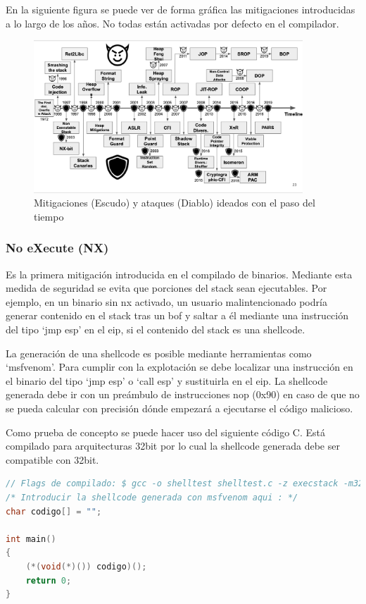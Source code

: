 En la siguiente figura se puede ver de forma gráfica las mitigaciones introducidas a lo largo de los años. No todas están activadas por defecto en el compilador.

\begin{figure}[htb!]
    \centering                        
    \includegraphics[width=0.9\textwidth]{images/mitigaciones.jpeg}
    \caption{Mitigaciones (Escudo) y ataques (Diablo) ideados con el paso del tiempo}
    \label{fig:mitigaciones}
\end{figure}
\FloatBarrier

\subsubsection{No eXecute (NX)}
Es la primera mitigación introducida en el compilado de binarios. Mediante esta medida de seguridad se evita que porciones del stack sean ejecutables.
Por ejemplo, en un binario sin \acrshort{nx} activado, un usuario malintencionado podría generar contenido en el stack tras un \acrshort{bof} y saltar a él mediante una instrucción del tipo `jmp esp' en el \acrshort{eip}, si el contenido del stack es una shellcode.

La generación de una shellcode es posible mediante herramientas como `msfvenom'.
Para cumplir con la explotación se debe localizar una instrucción en el binario del tipo `jmp esp' o `call esp' y sustituirla en el \acrshort{eip}. La shellcode generada debe ir con un preámbulo de instrucciones \acrfull{nop} (0x90) en caso de que no se pueda calcular con precisión dónde empezará a ejecutarse el código malicioso.

Como prueba de concepto se puede hacer uso del siguiente código C.
Está compilado para arquitecturas 32bit por lo cual la shellcode generada debe ser compatible con 32bit.

\begin{lstlisting}[language=C, caption=Código C para probar shellcodes]
// Flags de compilado: $ gcc -o shelltest shelltest.c -z execstack -m32
/* Introducir la shellcode generada con msfvenom aqui : */
char codigo[] = "";

int main()
{
    (*(void(*)()) codigo)();
    return 0;
}
\end{lstlisting}

